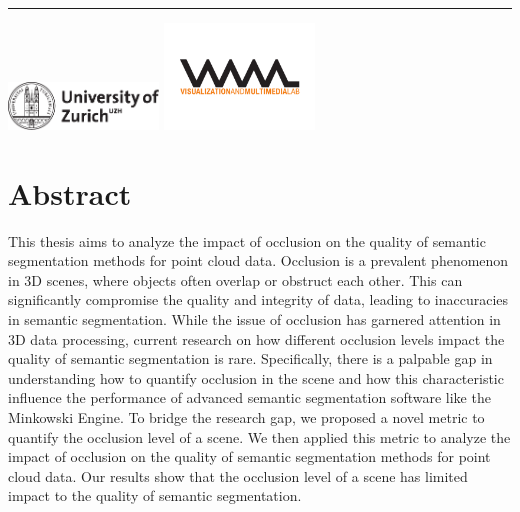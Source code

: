 \documentclass[11pt, a4paper,oneside,chapterprefix=false]{scrbook}
\begin{document}
\begin{titlepage}
	\vfill
	\hrule
	\vspace{0.5cm}
	\includegraphics*[width=0.3\textwidth]{figures/uzh_logo} \hfill
	\includegraphics*[width=0.3\textwidth]{figures/vmml_logo}
\end{titlepage}

\chapter{Abstract} \label{chp:abstract}

This thesis aims to analyze the impact of occlusion on the quality of semantic segmentation methods for point cloud data. Occlusion is a prevalent phenomenon in 3D scenes, where objects often overlap or obstruct each other. This can significantly compromise the quality and integrity of data, leading to inaccuracies in semantic segmentation. While the issue of occlusion has garnered attention in 3D data processing, current research on how different occlusion levels impact the quality of semantic segmentation is rare. Specifically, there is a palpable gap in understanding how to quantify occlusion in the scene and how this characteristic influence the performance of advanced semantic segmentation software like the Minkowski Engine. To bridge the research gap, we proposed a novel metric to quantify the occlusion level of a scene. We then applied this metric to analyze the impact of occlusion on the quality of semantic segmentation methods for point cloud data. Our results show that the occlusion level of a scene has limited impact to the quality of semantic segmentation.

\tableofcontents

\listoffigures

\lstlistoflistings

\mainmatter

\end{document}
